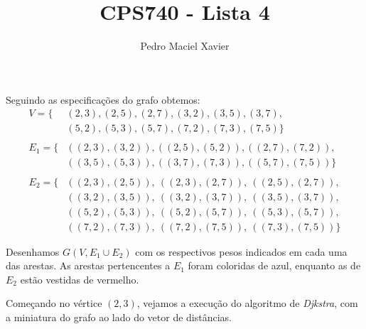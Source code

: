 \documentclass{homework}
\title{CPS740 - Lista 4}
\author{Pedro Maciel Xavier}
\begin{document}
	
	\maketitle
	
	\quest %
	
	Seguindo as especificações do grafo obtemos:
	\begin{align*}
		V = \{&(2, 3), (2, 5), (2, 7), (3, 2), (3, 5), (3, 7),\\
		&(5, 2), (5, 3), (5, 7), (7, 2), (7, 3), (7, 5)\}\\
		~\\
		E_1 = \{&((2, 3), (3, 2)), ((2, 5), (5, 2)), ((2, 7), (7, 2)),\\
		&((3, 5), (5, 3)), ((3, 7), (7, 3)), ((5, 7), (7, 5))\}\\
		~\\
		E_2 = \{&((2, 3), (2, 5)),~ ((2, 3), (2, 7)),~ ((2, 5), (2, 7)),\\
		&((3, 2), (3, 5)),~ ((3, 2), (3, 7)),~ ((3, 5), (3, 7)),\\
		&((5, 2), (5, 3)),~ ((5, 2), (5, 7)),~ ((5, 3), (5, 7)),\\
		&((7, 2), (7, 3)),~ ((7, 2), (7, 5)),~ ((7, 3), (7, 5))\}
	\end{align*}
	
	\subsubquest Desenhamos $G(V, E_1 \cup E_2)$ com os respectivos pesos indicados em cada uma das arestas. As arestas pertencentes a $E_1$ foram coloridas de {\color{blue!50}azul}, enquanto as de $E_2$ estão vestidas de {\color{red!50}vermelho}.
	
	\begin{fig}
			
	\end{fig}

	\pagebreak
	
	\subsubquest Começando no vértice $(2, 3)$, vejamos a execução do algoritmo de \textit{Djkstra}, com a miniatura do grafo ao lado do vetor de distâncias.
	
			

	\quest %
	
\end{document}
